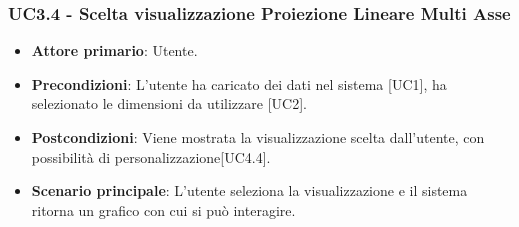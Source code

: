 \subsubsection{UC3.4 - Scelta visualizzazione Proiezione Lineare Multi Asse}

\begin{itemize}
	\item \textbf{Attore primario}: Utente.
	\item \textbf{Precondizioni}: L'utente ha caricato dei dati nel sistema [UC1], ha selezionato le dimensioni da utilizzare [UC2].
	\item \textbf{Postcondizioni}: Viene mostrata la visualizzazione  scelta dall'utente, con possibilità di personalizzazione[UC4.4].
	\item \textbf{Scenario principale}: L'utente seleziona la visualizzazione  e il sistema ritorna un grafico con cui si può interagire.
\end{itemize}